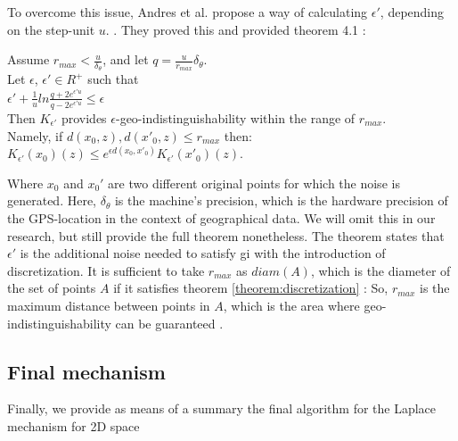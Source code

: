 To overcome this issue, Andres et al. propose a way of calculating $\epsilon'$, depending on the step-unit $u$. \citep{DBLP:journals/corr/abs-1212-1984}.
They proved this and provided theorem 4.1 \citep{DBLP:journals/corr/abs-1212-1984}:
\begin{theorem}
  Assume $r_{max} < \frac{u}{\delta_{\theta}}$, and let $q = \frac{u}{r_{max}}\delta_{\theta}$. \\ Let $\epsilon$, $\epsilon' \in R^+$ such that \\
  $\epsilon' + \frac{1}{u}ln \frac{q + 2 e^{\epsilon'u}}{q - 2 e^{\epsilon'u}} \leq \epsilon$ \\
Then $K_{\epsilon'}$ provides $\epsilon$-geo-indistinguishability within the range of $r_{max}$. \\ 
  Namely, if ${d(x_0, z), d(x'_0, z) \leq r_{max}}$ then: \\
  $K_{\epsilon'}(x_0)(z) \leq e^{\epsilon d(x_0, x'_{0})} K_{\epsilon'}(x'_{0})(z)$.
  \label{theorem:discretization}
\end{theorem}
Where $x_0$ and $x_0'$ are two different original points for which the noise is generated. 
Here, $\delta_{\theta}$ is the machine's precision, which is the hardware precision of the GPS-location in the context of geographical data. We will omit this in our research, but still provide the full theorem nonetheless.
The theorem states that $\epsilon'$ is the additional noise needed to satisfy \gls{gi} with the introduction of discretization.
It is sufficient to take $r_{max}$ as $diam(A)$, which is the diameter of the set of points $A$ if it satisfies theorem \ref{theorem:discretization} \citep{DBLP:journals/corr/abs-1212-1984}:
So, $r_{max}$ is the maximum distance between points in $A$, which is the area where geo-indistinguishability can be guaranteed \citep{9646489}.
\subsection{Final mechanism}
Finally, we provide as means of a summary the final algorithm for the Laplace mechanism for 2D space

\newpage